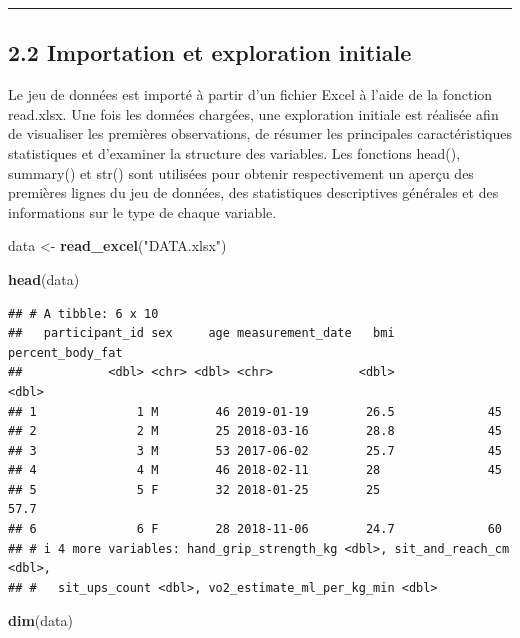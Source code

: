\documentclass[
]{article}
\newenvironment{Shaded}{\begin{snugshade}}{\end{snugshade}}
\newcommand{\FunctionTok}[1]{\textcolor[rgb]{0.13,0.29,0.53}{\textbf{#1}}}
\newcommand{\NormalTok}[1]{#1}
\newcommand{\OtherTok}[1]{\textcolor[rgb]{0.56,0.35,0.01}{#1}}
\newcommand{\StringTok}[1]{\textcolor[rgb]{0.31,0.60,0.02}{#1}}
\begin{document}
\begin{center}\rule{0.5\linewidth}{0.5pt}\end{center}

\subsection{2.2 Importation et exploration
initiale}\label{importation-et-exploration-initiale}

Le jeu de données est importé à partir d'un fichier Excel à l'aide de la
fonction read.xlsx. Une fois les données chargées, une exploration
initiale est réalisée afin de visualiser les premières observations, de
résumer les principales caractéristiques statistiques et d'examiner la
structure des variables. Les fonctions head(), summary() et str() sont
utilisées pour obtenir respectivement un aperçu des premières lignes du
jeu de données, des statistiques descriptives générales et des
informations sur le type de chaque variable.

\begin{Shaded}
\begin{Highlighting}[]
\NormalTok{data }\OtherTok{\textless{}{-}} \FunctionTok{read\_excel}\NormalTok{(}\StringTok{"DATA.xlsx"}\NormalTok{)}

\FunctionTok{head}\NormalTok{(data)}
\end{Highlighting}
\end{Shaded}

\begin{verbatim}
## # A tibble: 6 x 10
##   participant_id sex     age measurement_date   bmi percent_body_fat
##            <dbl> <chr> <dbl> <chr>            <dbl>            <dbl>
## 1              1 M        46 2019-01-19        26.5             45  
## 2              2 M        25 2018-03-16        28.8             45  
## 3              3 M        53 2017-06-02        25.7             45  
## 4              4 M        46 2018-02-11        28               45  
## 5              5 F        32 2018-01-25        25               57.7
## 6              6 F        28 2018-11-06        24.7             60  
## # i 4 more variables: hand_grip_strength_kg <dbl>, sit_and_reach_cm <dbl>,
## #   sit_ups_count <dbl>, vo2_estimate_ml_per_kg_min <dbl>
\end{verbatim}

\begin{Shaded}
\begin{Highlighting}[]
\FunctionTok{dim}\NormalTok{(data)}
\end{Highlighting}
\end{Shaded}
\end{document}

